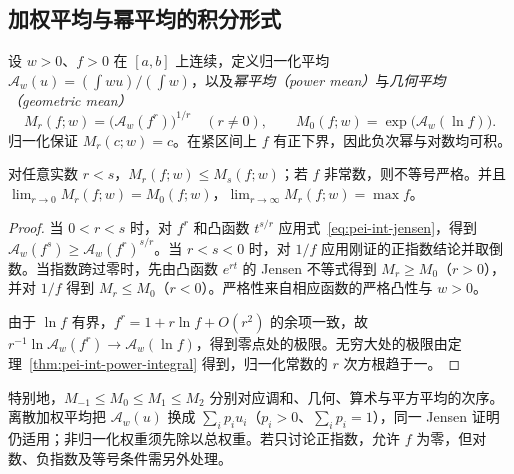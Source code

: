 \subsection{加权平均与幂平均的积分形式}
设 $w>0$、$f>0$ 在 $[a,b]$ 上连续，定义归一化平均 $\mathcal A_w(u)=(\int wu)/(\int w)$，以及\emph{幂平均（power mean）}与\emph{几何平均（geometric mean）}
\[
 M_r(f;w)=\bigl(\mathcal A_w(f^r)\bigr)^{1/r}\quad(r\ne0),
 \qquad M_0(f;w)=\exp\bigl(\mathcal A_w(\ln f)\bigr).
\]
归一化保证 $M_r(c;w)=c$。在紧区间上 $f$ 有正下界，因此负次幂与对数均可积。

\begin{theorem}
\label{thm:pei-int-power-means}
对任意实数 $r<s$，$M_r(f;w)\le M_s(f;w)$；若 $f$ 非常数，则不等号严格。并且 $\lim_{r\to0}M_r(f;w)=M_0(f;w)$，$\lim_{r\to\infty}M_r(f;w)=\max f$。
\end{theorem}
\begin{proof}
当 $0<r<s$ 时，对 $f^r$ 和凸函数 $t^{s/r}$ 应用式~\eqref{eq:pei-int-jensen}，得到 $\mathcal A_w(f^s)\ge\mathcal A_w(f^r)^{s/r}$。当 $r<s<0$ 时，对 $1/f$ 应用刚证的正指数结论并取倒数。当指数跨过零时，先由凸函数 $e^{rt}$ 的 Jensen 不等式得到 $M_r\ge M_0$（$r>0$），并对 $1/f$ 得到 $M_r\le M_0$（$r<0$）。严格性来自相应函数的严格凸性与 $w>0$。

由于 $\ln f$ 有界，$f^r=1+r\ln f+O(r^2)$ 的余项一致，故 $r^{-1}\ln\mathcal A_w(f^r)\to\mathcal A_w(\ln f)$，得到零点处的极限。无穷大处的极限由定理~\ref{thm:pei-int-power-integral} 得到，归一化常数的 $r$ 次方根趋于一。
\end{proof}
特别地，$M_{-1}\le M_0\le M_1\le M_2$ 分别对应调和、几何、算术与平方平均的次序。离散加权平均把 $\mathcal A_w(u)$ 换成 $\sum_i p_i u_i$（$p_i>0$、$\sum_i p_i=1$），同一 Jensen 证明仍适用；非归一化权重须先除以总权重。若只讨论正指数，允许 $f$ 为零，但对数、负指数及等号条件需另外处理。

